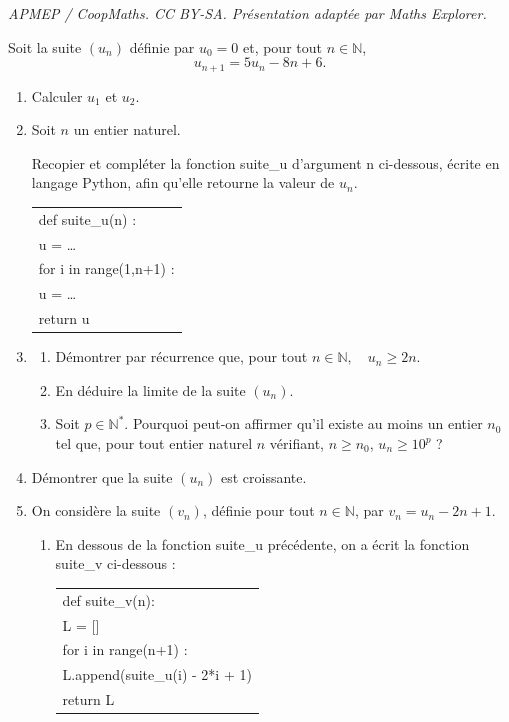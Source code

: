 \documentclass[10pt]{article}
\providecommand{\N}{\mathbb{N}}
\begin{document}
\noindent\textit{APMEP / CoopMaths. CC BY-SA. Présentation adaptée par Maths Explorer.}\par\medskip
\medskip

Soit la suite $\left(u_n\right)$ définie par $u_0 = 0$ et, pour tout $n \in \N$, 
\[u_{n+1} = 5u_n - 8n + 6.\]

\smallskip

\begin{enumerate}
\item Calculer $u_1$ et $u_2$.
\item Soit $n$ un entier naturel.

Recopier et compléter la fonction {\ttfamily suite\_u} d'argument {\ttfamily n}  ci-dessous, écrite en langage Python, afin qu'elle retourne la valeur de $u_n$.

\begin{center}
\begin{tabular}{>{\ttfamily}l}
def suite\_u(n) : \\
\qquad u = \ldots\\
\qquad for i in range(1,n+1) :\\
\qquad \vline \qquad u = \ldots\\
\qquad return u
\end{tabular}
\end{center}
\item
	\begin{enumerate}
		\item Démontrer par récurrence que, pour tout $n \in \N ,\quad  u_n \geqslant 2n$.
		\item En déduire la limite de la suite $\left(u_n\right)$.
		\item Soit $p \in \N^*$. Pourquoi peut-on affirmer qu'il existe au moins un entier $n_0$ tel que,  pour tout entier naturel $n$ vérifiant, $n \geqslant n_0$,\: $u_n \geqslant  10^p$ ?
\end{enumerate}
\item Démontrer que la suite $\left(u_n\right)$ est croissante.
\item On considère la suite $\left(v_n\right)$, définie pour tout $n \in  \N$, par $v_n = u_n - 2n + 1$.
	\begin{enumerate}
		\item En dessous de la fonction {\ttfamily suite\_u} précédente, on a écrit la fonction {\ttfamily suite\_v} ci-dessous :
\begin{center}
\begin{tabular}{>{\ttfamily}l}
def suite\_v(n):\\
\qquad L = []\\
\qquad  for i in range(n+1) :\\
\qquad \vline \qquad L.append(suite\_u(i) - 2*i + 1)\\
\qquad return L
\end{tabular}
\end{center}


\end{enumerate}
\end{enumerate}
\end{document}
